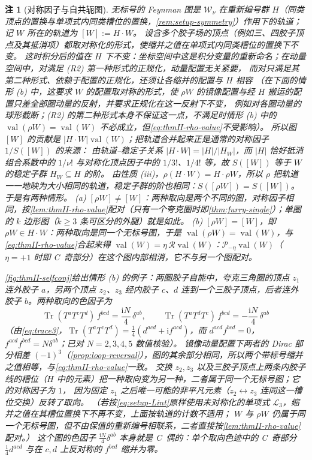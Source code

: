 \documentclass[UTF8,a4paper,11pt,fontset=fandol]{ctexart}
\theoremstyle{cplain}
\theoremstyle{cdefinition}
\theoremstyle{cremark}
\newtheorem{remark}[theorem]{注}
\numberwithin{equation}{section}
\DeclareMathOperator{\Tr}{Tr}
\newcommand{\Rop}{\mathcal{R}}                       %
\newcommand{\ii}{\mathrm{i}}                        %
\begin{document}
\begin{remark}[对称因子与自共轭图]\label{rem:thmII-selfconj}
无标号的 Feynman 图是 $\mathcal W_\nu$ 在重新编号群 $H$（同类顶点的置换与单项式内同类槽位的置换，\cref{rem:setup-symmetry}）作用下的轨道；记 $W$ 所在的轨道为 $[W]:=H\cdot W$。
设含多个胶子场的顶点（例如三、四胶子顶点及其抵消项）都取对称化的形式，使缩并之值在单项式内同类槽位的置换下不变。
这时积分后的值在 $H$ 下不变：坐标空间中这是积分变量的重新命名；在动量空间中，对满足 (R2) 第一种形式的正规化，动量配置无关紧要，
而对只满足其第二种形式、依赖于配置的正规化，还须让各缩并的配置与 $H$ 相容
（在下面的情形 (b) 中，这要求 $W$ 的配置取对称的形式，使 $\rho W$ 的镜像配置与经 $H$ 搬运的配置只差全部圈动量的反射，并要求正规化在这一反射下不变，
例如对各圈动量的球形截断；(R2) 的第二种形式本身不保证这一点，不满足时情形 (b) 中的 $\operatorname{val}(\rho W)=\operatorname{val}(W)$ 不必成立，但\cref{eq:thmII-rho-value}不受影响）。
所以图 $[W]$ 的贡献是 $|H\cdot W|\operatorname{val}(W)$；把轨道合并起来正是通常的对称因子 $1/S([W])$ 的来源：
由轨道--稳定子关系 $|H\cdot W|=|H|/|H_W|$，而 $|H|$ 恰好抵消组合系数中的 $1/\nu!$ 与对称化顶点因子中的 $1/3!$、$1/4!$ 等，故 $S([W])$ 等于 $W$ 的稳定子群 $H_W\subseteq H$ 的阶。
由性质 (iii)，$\rho(H\cdot W)=H\cdot\rho W$，所以 $\rho$ 把轨道一一地映为大小相同的轨道，稳定子群的阶也相同：$S([\rho W])=S([W])$。于是有两种情形。
(a) $[\rho W]\neq[W]$：两种取向是两个不同的图，对称因子相同，按\cref{lem:thmII-rho-value}配对（只有一个夸克圈时即\cref{thm:furry-single}）；单圈的 $k$ 边形图（$k\ge3$ 条可区分的外腿）就是如此。
(b) $[\rho W]=[W]$，即 $\rho W\in H\cdot W$：两种取向是\emph{同一个}无标号图，于是 $\operatorname{val}(\rho W)=\operatorname{val}(W)$，与\cref{eq:thmII-rho-value}合起来得
$\operatorname{val}(W)=\eta\,\Rop\operatorname{val}(W)$：$\mathcal P_{-\eta}\operatorname{val}(W)$（$\eta=+1$ 时即 C~奇部分）在这个图\emph{内部}相消，它不与另一个图配对。

\cref{fig:thmII-selfconj}给出情形 (b) 的例子：两圈胶子自能中，夸克三角圈的顶点 $z_1$ 连外胶子 $a$，另两个顶点 $z_2$、$z_3$ 经内胶子 $c$、$d$ 连到一个三胶子顶点，后者连外胶子 $b$。两种取向的色因子为
\begin{equation}\label{eq:thmII-selfconj}
\Tr(T^aT^cT^d)\,f^{bcd}=\frac{\ii N}{4}\,\delta^{ab},\qquad \Tr(T^aT^dT^c)\,f^{bcd}=-\frac{\ii N}{4}\,\delta^{ab}
\end{equation}
（由\cref{eq:trace3}，$\Tr(T^aT^cT^d)=\frac14(d^{acd}+\ii f^{acd})$，而 $d^{acd}f^{bcd}=0$，$f^{acd}f^{bcd}=N\delta^{ab}$；已对 $N=2,3,4,5$ 数值核验）。
镜像动量配置下两者的 Dirac 部分相差 $(-1)^3$（\cref{prop:loop-reversal}），图的其余部分相同，所以两个带标号缩并之值\emph{相等}，与\cref{eq:thmII-rho-value}一致。
交换 $z_2,z_3$ 以及三胶子顶点上两条内胶子线的槽位（$H$ 中的元素）把一种取向变为另一种，二者属于同一个无标号图；它的对称因子为 $1$，
因为固定 $z_1$ 之后唯一可能的非平凡元素（$z_2\leftrightarrow z_3$ 连同这一槽位交换）反转了取向。
（若按\cref{eq:setup-Lint}原样使用未对称化的单项式 $\mathcal L_3$，缩并之值在其槽位置换下不再不变，上面按轨道的计数不适用；
$W$ 与 $\rho W$ 仍属于同一个无标号图，但不由保值的重新编号相联系，二者直接按\cref{lem:thmII-rho-value}配对。）
这个图的色因子 $\frac{\ii N}{4}\delta^{ab}$ 本身就是 C~偶的：单个取向色迹中的 C~奇部分 $\frac14d^{acd}$ 与在 $c,d$ 上反对称的 $f^{bcd}$ 缩并为零。


\end{remark}
\end{document}

